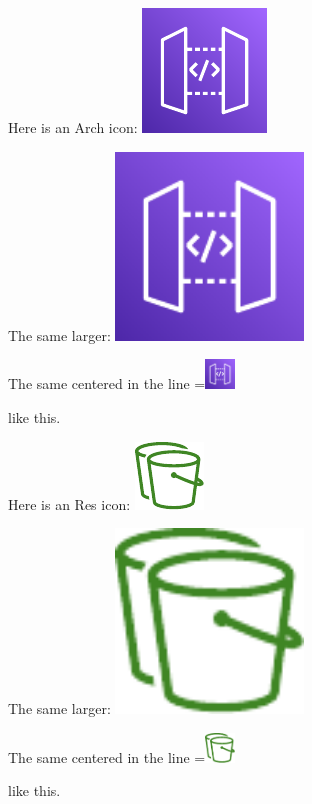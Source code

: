 \documentclass[12pt]{article}
\newcommand{\vcenteredinclude}[1]{\begingroup
\setbox0=\hbox{#1}%
\parbox{\wd0}{\box0}\endgroup}
\begin{document}
Here is an Arch icon:
\includegraphics[width=.8cm]{../icons_tex/Arch_Amazon-API-Gateway_64.pdf}

\vspace{1cm}
The same larger: \includegraphics[width=5cm]{../icons_tex/Arch_Amazon-API-Gateway_64.pdf}

\vspace{1cm}
The same centered in the line \vcenteredinclude{\includegraphics[width=0.8cm]{../icons_tex/Arch_Amazon-API-Gateway_64.pdf}} like this.

\vspace{3cm}

Here is an Res icon:
\includegraphics[width=.8cm]{../icons_tex/Res_AWS-Amazon-Simple-Storage_S3-Replication_48_Light.pdf}

\vspace{2cm}
The same larger: \includegraphics[width=5cm]{../icons_tex/Res_AWS-Amazon-Simple-Storage_S3-Replication_48_Light.pdf}

\vspace{1cm}
The same centered in the line \vcenteredinclude{\includegraphics[width=0.8cm]{../icons_tex/Res_AWS-Amazon-Simple-Storage_S3-Replication_48_Light.pdf}} like this.
\end{document}
